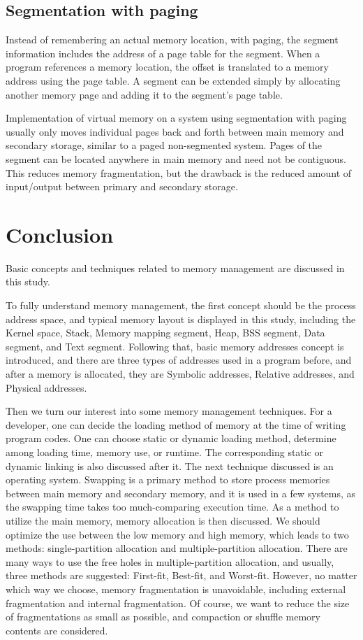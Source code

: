 \documentclass[doc,natbib,12pt]{apa6}
\begin{document}
	\subsection{Segmentation with paging}
	Instead of remembering an actual memory location, with paging, the segment information includes the address of a page table for the segment. When a program references a memory location, the offset is translated to a memory address using the page table. A segment can be extended simply by allocating another memory page and adding it to the segment's page table.
	
	Implementation of virtual memory on a system using segmentation with paging usually only moves individual pages back and forth between main memory and secondary storage, similar to a paged non-segmented system. Pages of the segment can be located anywhere in main memory and need not be contiguous. This reduces memory fragmentation, but the drawback is the reduced amount of input/output between primary and secondary storage.
	
	\newpage
	\section{Conclusion}
	Basic concepts and techniques related to memory management are discussed in this study.
	
	To fully understand memory management, the first concept should be the process address space, and typical memory layout is displayed in this study, including the Kernel space, Stack, Memory mapping segment, Heap, BSS segment, Data segment, and Text segment. Following that, basic memory addresses concept is introduced, and there are three types of addresses used in a program before, and after a memory is allocated, they are Symbolic addresses, Relative addresses, and Physical addresses.
	
	Then we turn our interest into some memory management techniques. For a developer, one can decide the loading method of memory at the time of writing program codes. One can choose static or dynamic loading method, determine among loading time, memory use, or runtime. The corresponding static or dynamic linking is also discussed after it. The next technique discussed is an operating system. Swapping is a primary method to store process memories between main memory and secondary memory, and it is used in a few systems, as the swapping time takes too much-comparing execution time.  As a method to utilize the main memory, memory allocation is then discussed. We should optimize the use between the low memory and high memory, which leads to two methods: single-partition allocation and multiple-partition allocation. There are many ways to use the free holes in multiple-partition allocation, and usually, three methods are suggested: First-fit, Best-fit, and Worst-fit. However, no matter which way we choose, memory fragmentation is unavoidable, including external fragmentation and internal fragmentation. Of course, we want to reduce the size of fragmentations as small as possible, and compaction or shuffle memory contents are considered. 
	
\end{document}
